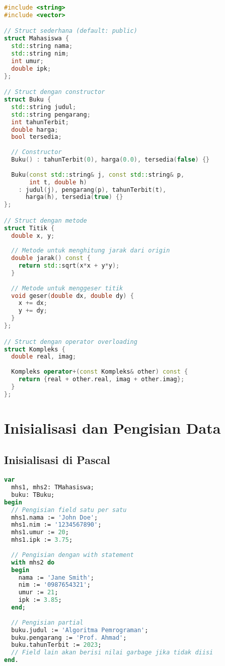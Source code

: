 \documentclass[../main.tex]{subfiles}
\begin{document}
\begin{lstlisting}[language=C++, caption={Deklarasi struct di C++}]
#include <string>
#include <vector>

// Struct sederhana (default: public)
struct Mahasiswa {
  std::string nama;
  std::string nim;
  int umur;
  double ipk;
};

// Struct dengan constructor
struct Buku {
  std::string judul;
  std::string pengarang;
  int tahunTerbit;
  double harga;
  bool tersedia;
  
  // Constructor
  Buku() : tahunTerbit(0), harga(0.0), tersedia(false) {}
  
  Buku(const std::string& j, const std::string& p, 
       int t, double h) 
    : judul(j), pengarang(p), tahunTerbit(t), 
      harga(h), tersedia(true) {}
};

// Struct dengan metode
struct Titik {
  double x, y;
  
  // Metode untuk menghitung jarak dari origin
  double jarak() const {
    return std::sqrt(x*x + y*y);
  }
  
  // Metode untuk menggeser titik
  void geser(double dx, double dy) {
    x += dx;
    y += dy;
  }
};

// Struct dengan operator overloading
struct Kompleks {
  double real, imag;
  
  Kompleks operator+(const Kompleks& other) const {
    return {real + other.real, imag + other.imag};
  }
};
\end{lstlisting}

\section{Inisialisasi dan Pengisian Data}

\subsection{Inisialisasi di Pascal}

\begin{lstlisting}[language=Pascal, caption={Inisialisasi record di Pascal}]
var
  mhs1, mhs2: TMahasiswa;
  buku: TBuku;
begin
  // Pengisian field satu per satu
  mhs1.nama := 'John Doe';
  mhs1.nim := '1234567890';
  mhs1.umur := 20;
  mhs1.ipk := 3.75;
  
  // Pengisian dengan with statement
  with mhs2 do
  begin
    nama := 'Jane Smith';
    nim := '0987654321';
    umur := 21;
    ipk := 3.85;
  end;
  
  // Pengisian partial
  buku.judul := 'Algoritma Pemrograman';
  buku.pengarang := 'Prof. Ahmad';
  buku.tahunTerbit := 2023;
  // Field lain akan berisi nilai garbage jika tidak diisi
end.
\end{lstlisting}
\end{document}
